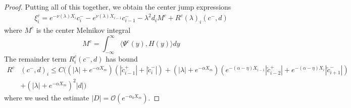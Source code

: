 \documentclass[thesis.tex]{subfiles}
\begin{document}
\begin{lemma}
\begin{proof}
Putting all of this together, we obtain the center jump expressions
\begin{align*}
\xi^c_i = e^{-\nu(\lambda) X_i} c_i^- - e^{\nu(\lambda) X_{i-1}} c_{i-1}^- - \lambda^2 d_i M^c + R^c(\lambda)_i(c^-, d)
\end{align*}
where $M^c$ is the center Melnikov integral
\[
M^c = \int_{-\infty}^\infty \langle \Psi^c(y), H(y) \rangle dy 
\]
The remainder term $R^c_i(c^-, d)$ has bound
\begin{align*}
R^c&(c^-, d)_i \leq C \Big(
(|\lambda| + e^{-\alpha X_m})(|\tilde{c}_{i-1}^+| + |\tilde{c}_{i}^-|) + (|\lambda| + e^{-\alpha X_m})(  e^{-(\alpha - \eta) X_{i-1} } |\tilde{c}_{i-2}^+| + e^{-(\alpha - \eta) X_i } |\tilde{c}_{i+1}^-|)  \\
&+ (|\lambda| + e^{-\alpha X_m})^2 |d|
\Big)
\end{align*}
where we used the estimate $|D| = \mathcal{O}(e^{-\alpha_0 X_m})$. 


\end{proof}
\end{lemma}
\end{document}
